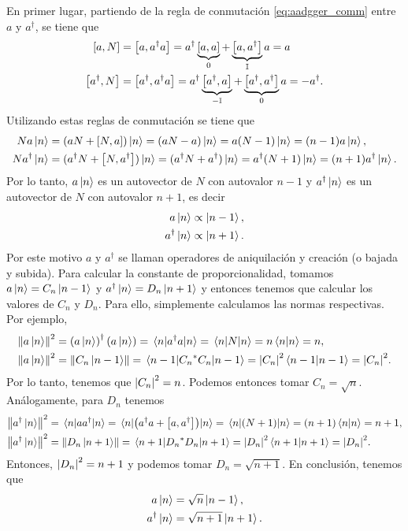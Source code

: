 \documentclass[10pt, a4paper]{article}
\newcommand{\Nexpr}{a^\dagger a}
\newcommand{\N}{N}
\numberwithin{equation}{subsection}
\begin{document}
En primer lugar, partiendo de la regla de conmutación \eqref{eq:aadgger_comm}
entre $a$ y $a^\dagger$, se tiene que
\begin{align}
  \comm{a}{\N} &= \comm{a}{\Nexpr}
    = a^\dagger\underbrace{\comm{a}{a}}_{0} +
    \underbrace{\comm{a}{a^\dagger}}_{\Id}a = a \\
  \comm{a^\dagger}{\N} &= \comm{a^\dagger}{\Nexpr}
    = a^\dagger\underbrace{\comm{a^\dagger}{a}}_{-\Id} +
    \underbrace{\comm{a^\dagger}{a^\dagger}}_{0}a = -a^\dagger.
\end{align}
Utilizando estas reglas de conmutación se tiene que
\begin{align}
  \N a\ket{n} &= (a\N + \comm{\N}{a})\ket{n} = (a\N - a)\ket{n} =
    a(\N - 1)\ket{n} = (n - 1)a\ket{n}, \label{eq:Na} \\
  \N a^\dagger\ket{n} &= (a^\dagger\N + \comm{\N}{a^\dagger})\ket{n} =
    (a^\dagger\N + a^\dagger)\ket{n} = a^\dagger(\N + 1)\ket{n} =
    (n + 1)a^\dagger\ket{n}. \label{eq:Nadagger}
\end{align}
Por lo tanto, $a\ket{n}$ es un autovector de $\N$ con autovalor $n - 1$ y
$a^\dagger\ket{n}$ es un autovector de $\N$ con autovalor $n + 1$, es decir
\begin{align}
  a\ket{n} &\propto \ket{n-1}, \\
  a^\dagger\ket{n} &\propto \ket{n+1}.
\end{align}
Por este motivo $a$ y $a^\dagger$ se llaman operadores de aniquilación y
creación (o bajada y subida). Para calcular la constante de proporcionalidad,
tomamos $a\ket{n} = C_n\ket{n-1}$ y $a^\dagger\ket{n} = D_n\ket{n+1}$ y
entonces tenemos que calcular los valores de $C_n$ y $D_n$. Para ello,
simplemente calculamos las normas respectivas. Por ejemplo,
\begin{align}
  \norm{a\ket{n}}^2 &= \left(a\ket{n}\right)^\dagger\left(a\ket{n}\right) =
    \matrixel{n}{a^\dagger a}{n} = \matrixel{n}{\N}{n} = n\braket{n}{n} = n,
    \label{eq:norm_adagger} \\
  \norm{a\ket{n}}^2 &= \norm{C_n\ket{n-1}} = \matrixel{n-1}{\conj{C_n}C_n}{n-1}
    = \abs{C_n}^2\braket{n-1}{n-1} = \abs{C_n}^2.
\end{align}
Por lo tanto, tenemos que $\abs{C_n}^2 = n$. Podemos entonces tomar $C_n =
\sqrt{n}$. Análogamente, para $D_n$ tenemos
\begin{align}
  \norm{a^\dagger\ket{n}}^2 &= \matrixel{n}{aa^\dagger}{n} =
    \matrixel{n}{\left(\Nexpr + \comm{a}{a^\dagger}\right)}{n} =
    \matrixel{n}{\left(\N + 1\right)}{n} = (n + 1)\braket{n}{n}
    = n + 1, \\
  \norm{a^\dagger\ket{n}}^2 &= \norm{D_n\ket{n+1}} =
    \matrixel{n+1}{\conj{D_n}D_n}{n+1} = \abs{D_n}^2\braket{n+1}{n+1} =
    \abs{D_n}^2.
\end{align}
Entonces, $\abs{D_n}^2 = n + 1$ y podemos tomar $D_n = \sqrt{n + 1}$. En
conclusión, tenemos que
\begin{align}
  a\ket{n} &= \sqrt{n}\ket{n - 1}, \label{eq:a_ketn} \\
  a^\dagger\ket{n} &= \sqrt{n + 1}\ket{n + 1}. \label{eq:adagger_ketn}
\end{align}
\end{document}
